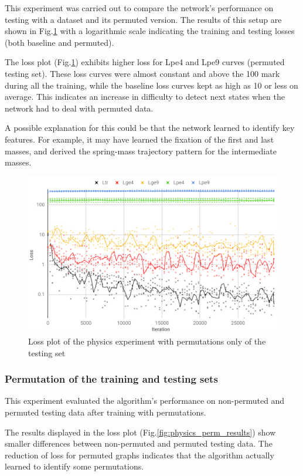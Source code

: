 This experiment was carried out to compare the network’s performance on testing with a dataset and its permuted version. The results of this setup are shown in Fig.\ref{fig:physics_base_results} with a logarithmic scale indicating the training and testing losses (both baseline and permuted).

The loss plot (Fig.\ref{fig:physics_base_results}) exhibits higher loss for Lpe4 and Lpe9 curves (permuted testing set). These loss curves were almost constant and above the 100 mark during all the training, while the baseline loss curves kept as high as 10 or less on average. This indicates an increase in difficulty to detect next states when the network had to deal with permuted data.

A possible explanation for this could be that the network learned to identify key features. For example, it may have learned the fixation of the first and last masses, and derived the spring-mass trajectory pattern for the intermediate masses.

\begin{figure}[H]
    \centering
    \includegraphics[width=.9\linewidth]{fig/content/results/physics/physics_base.png}
    \caption{Loss plot of the physics experiment with permutations only of the testing set}
    \label{fig:physics_base_results}
\end{figure}

\subsubsection {Permutation of the training and testing sets}

This experiment evaluated the algorithm’s performance on non-permuted and permuted testing data after training with permutations.

The results displayed in the loss plot (Fig.\ref{fig:physics_perm_results}) show smaller differences between non-permuted and permuted testing data. The reduction of loss for permuted graphs indicates that the algorithm actually learned to identify some permutations.

